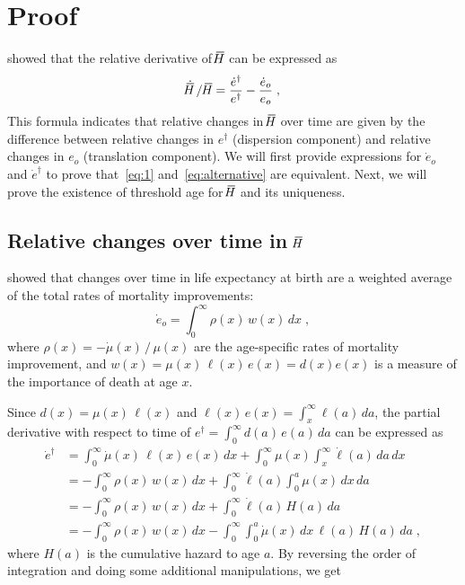 \documentclass[a4paper,twoside, openright, 12pt, leqno]{article}
\newcommand*\xbar[1]{%
   \hbox{%
     \vbox{%
       \hrule height 0.5pt %
       \kern0.3ex%
       \hbox{%
         \kern-0.25em%
         \ensuremath{#1}%
         \kern-0.05em%
       }%
     }%
   }%
}
\begin{document}
\section{Proof}

\cite{Fernandez2015} showed that the relative derivative of  $\xbar{H}$ can be expressed as
%
\begin{equation}
\dot{\xbar{H}}\,/\,\xbar{H}=\frac{\dot{e}^\dagger}{e^\dagger}-\frac{\dot{e}_o}{e_o}\;,
\label{eq:alternative}
\end{equation}
%
This formula indicates that relative changes in $\xbar{H}$ over time are given by the difference between relative changes in $e^\dagger$ (dispersion component) and relative changes in $e_o$ (translation component). We will first provide expressions for $\dot{e}_o$ and $\dot{e}^\dagger$ to prove that~\eqref{eq:1} and~\eqref{eq:alternative} are equivalent. Next, we will prove the existence of threshold age for $\xbar{H}$ and its uniqueness.

 
\subsection{Relative changes over time in $\xbar{H}$}

\cite{Vaupel2003} showed that changes over time in life expectancy at birth are a weighted average of the total rates of mortality improvements:
%
\begin{equation}
\label{ex.derivative}
\dot{e}_o=\int_0^\infty\rho(x)\,w(x)\,dx\;,
\end{equation}
where $\rho(x)=-\dot{\mu}(x)\,/\,\mu(x)$ are the age-specific rates of mortality improvement, and $w(x)=\mu(x)\,\ell(x)\,e(x) = d(x)e(x)$ is a measure of the importance of death at age $x$. 

Since $d(x)=\mu(x)\,\ell(x)$ and $\ell(x)\,e(x)=\int_x^\infty\ell(a)\,da$, the partial derivative with respect to time of $e^\dagger=\int_0^\infty d(a)\,e(a)\,da$ can be expressed as
%
\begin{equation*}
 \begin{split}
 \dot{e}^\dagger	& = \int_0^\infty\dot{\mu}(x)\,\ell(x)\,e(x)\,dx+\int_0^\infty\mu(x)\int_x^\infty\dot{\ell}(a)\,da\,dx		\\
			& = -\int_0^\infty\rho(x)\,w(x)\,dx+\int_0^\infty\dot{\ell}(a)\int_0^a\mu(x)\,dx\,da                         \\
			& = -\int_0^\infty\rho(x)\,w(x)\,dx+\int_0^\infty\dot{\ell}(a)\,H(a)\,da     \\
			& = -\int_0^\infty\rho(x)\,w(x)\,dx-\int_0^\infty\int_0^a\dot{\mu}(x)\,dx\,\ell(a)\,H(a)\,da\;,
 \end{split}
\end{equation*}
%
where $H(a)$ is the cumulative hazard to age $a$. By reversing the order of integration and doing some additional manipulations, we get
\end{document}
